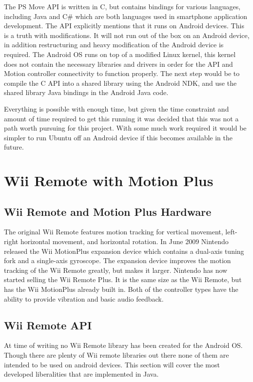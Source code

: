 \documentclass[11pt,twoside,a4paper]{report}
\begin{document}
The PS Move API \cite{PSMoveAPI} is written in C, but contains bindings for various languages, including Java and C\# which are both languages used in smartphone application development. The API explicitly mentions that it runs on Android devices. This is a truth with modifications. It will not run out of the box on an Android device, in addition restructuring and heavy modification of the Android device is required.  The Android OS runs on top of a modified Linux kernel, this kernel does not contain the necessary libraries and drivers in order for the API and Motion controller connectivity to function properly. %
The next step would be to compile the C API into a shared library using the Android NDK, and use the shared library Java bindings in the Android Java code.

Everything is possible with enough time, but given the time constraint and amount of time required to get this running it was decided that this was not a path worth pursuing for this project. With some much work required it would be simpler to run Ubuntu off an Android device if this becomes available in the future. %

\section{Wii Remote with Motion Plus}

\subsection{Wii Remote and Motion Plus Hardware}
The original Wii Remote features motion tracking for vertical movement, left-right horizontal movement, and horizontal rotation. %
In June 2009 %
Nintendo released the Wii MotionPlus expansion device which contains a dual-axis tuning fork and a single-axis gyroscope. %
The expansion device improves the motion tracking of the Wii Remote greatly, but makes it larger. Nintendo has now started selling the Wii Remote Plus. It is the same size as the Wii Remote, but has the Wii MotionPlus already built in. Both of the controller types have the ability to provide vibration and basic audio feedback.


\subsection{Wii Remote API}
At time of writing no Wii Remote library has been created for the Android OS. Though there are plenty of Wii remote libraries out there none of them are intended to be used on android devices. This section will cover the most developed liberalities that are implemented in Java.
\end{document}
